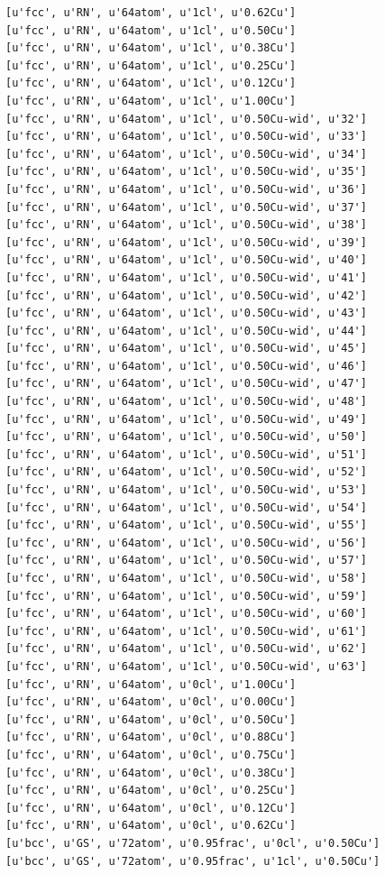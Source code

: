 \documentclass[number, sort&compress, review, 12pt]{elsarticle}
\begin{document}
\begin{verbatim}
[u'fcc', u'RN', u'64atom', u'1cl', u'0.62Cu']
[u'fcc', u'RN', u'64atom', u'1cl', u'0.50Cu']
[u'fcc', u'RN', u'64atom', u'1cl', u'0.38Cu']
[u'fcc', u'RN', u'64atom', u'1cl', u'0.25Cu']
[u'fcc', u'RN', u'64atom', u'1cl', u'0.12Cu']
[u'fcc', u'RN', u'64atom', u'1cl', u'1.00Cu']
[u'fcc', u'RN', u'64atom', u'1cl', u'0.50Cu-wid', u'32']
[u'fcc', u'RN', u'64atom', u'1cl', u'0.50Cu-wid', u'33']
[u'fcc', u'RN', u'64atom', u'1cl', u'0.50Cu-wid', u'34']
[u'fcc', u'RN', u'64atom', u'1cl', u'0.50Cu-wid', u'35']
[u'fcc', u'RN', u'64atom', u'1cl', u'0.50Cu-wid', u'36']
[u'fcc', u'RN', u'64atom', u'1cl', u'0.50Cu-wid', u'37']
[u'fcc', u'RN', u'64atom', u'1cl', u'0.50Cu-wid', u'38']
[u'fcc', u'RN', u'64atom', u'1cl', u'0.50Cu-wid', u'39']
[u'fcc', u'RN', u'64atom', u'1cl', u'0.50Cu-wid', u'40']
[u'fcc', u'RN', u'64atom', u'1cl', u'0.50Cu-wid', u'41']
[u'fcc', u'RN', u'64atom', u'1cl', u'0.50Cu-wid', u'42']
[u'fcc', u'RN', u'64atom', u'1cl', u'0.50Cu-wid', u'43']
[u'fcc', u'RN', u'64atom', u'1cl', u'0.50Cu-wid', u'44']
[u'fcc', u'RN', u'64atom', u'1cl', u'0.50Cu-wid', u'45']
[u'fcc', u'RN', u'64atom', u'1cl', u'0.50Cu-wid', u'46']
[u'fcc', u'RN', u'64atom', u'1cl', u'0.50Cu-wid', u'47']
[u'fcc', u'RN', u'64atom', u'1cl', u'0.50Cu-wid', u'48']
[u'fcc', u'RN', u'64atom', u'1cl', u'0.50Cu-wid', u'49']
[u'fcc', u'RN', u'64atom', u'1cl', u'0.50Cu-wid', u'50']
[u'fcc', u'RN', u'64atom', u'1cl', u'0.50Cu-wid', u'51']
[u'fcc', u'RN', u'64atom', u'1cl', u'0.50Cu-wid', u'52']
[u'fcc', u'RN', u'64atom', u'1cl', u'0.50Cu-wid', u'53']
[u'fcc', u'RN', u'64atom', u'1cl', u'0.50Cu-wid', u'54']
[u'fcc', u'RN', u'64atom', u'1cl', u'0.50Cu-wid', u'55']
[u'fcc', u'RN', u'64atom', u'1cl', u'0.50Cu-wid', u'56']
[u'fcc', u'RN', u'64atom', u'1cl', u'0.50Cu-wid', u'57']
[u'fcc', u'RN', u'64atom', u'1cl', u'0.50Cu-wid', u'58']
[u'fcc', u'RN', u'64atom', u'1cl', u'0.50Cu-wid', u'59']
[u'fcc', u'RN', u'64atom', u'1cl', u'0.50Cu-wid', u'60']
[u'fcc', u'RN', u'64atom', u'1cl', u'0.50Cu-wid', u'61']
[u'fcc', u'RN', u'64atom', u'1cl', u'0.50Cu-wid', u'62']
[u'fcc', u'RN', u'64atom', u'1cl', u'0.50Cu-wid', u'63']
[u'fcc', u'RN', u'64atom', u'0cl', u'1.00Cu']
[u'fcc', u'RN', u'64atom', u'0cl', u'0.00Cu']
[u'fcc', u'RN', u'64atom', u'0cl', u'0.50Cu']
[u'fcc', u'RN', u'64atom', u'0cl', u'0.88Cu']
[u'fcc', u'RN', u'64atom', u'0cl', u'0.75Cu']
[u'fcc', u'RN', u'64atom', u'0cl', u'0.38Cu']
[u'fcc', u'RN', u'64atom', u'0cl', u'0.25Cu']
[u'fcc', u'RN', u'64atom', u'0cl', u'0.12Cu']
[u'fcc', u'RN', u'64atom', u'0cl', u'0.62Cu']
[u'bcc', u'GS', u'72atom', u'0.95frac', u'0cl', u'0.50Cu']
[u'bcc', u'GS', u'72atom', u'0.95frac', u'1cl', u'0.50Cu']

\end{verbatim}
\end{document}
